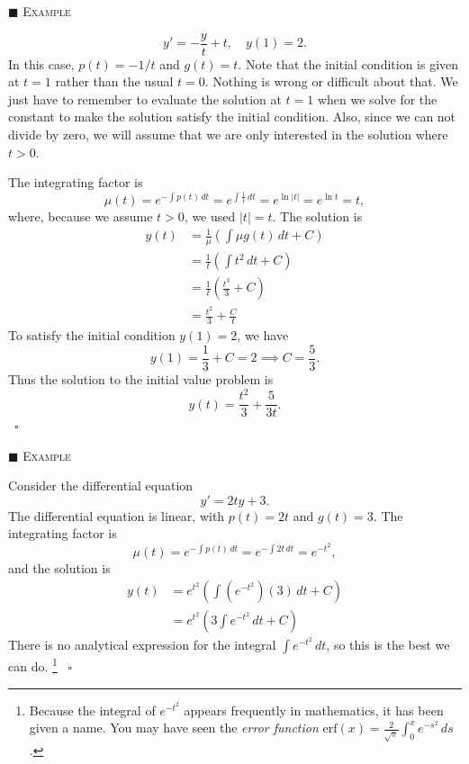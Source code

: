 \documentclass[reqno]{immbook}
\numberwithin{equation}{chapter}
\numberwithin{question}{section}
\numberwithin{theorem}{chapter}
\numberwithin{figure}{chapter}
\theoremstyle{definition}
\newenvironment{xexample}%
{%

\medskip\noindent\addtocounter{example}{1}$\blacksquare$ \textsc{Example \theexample}\hspace*{1em}%
}%
{%
~\hfill$\square$

\medskip
}
\begin{document}
\begin{xexample}
\begin{equation}
   y' = -\frac{y}{t} + t, \quad y(1) = 2.
\end{equation}
In this case, $p(t) = -1/t$ and $g(t) = t$.
Note that the initial condition is given at
$t=1$ rather than the usual $t=0$.  Nothing
is wrong or difficult about that. We just have
to remember to evaluate the solution at $t=1$
when we solve for the constant to make
the solution satisfy the initial condition.
Also, since we can not divide by zero, we will
assume that we are only interested in the solution
where $t > 0$.

The integrating factor is
\begin{equation}
   \mu(t) = e^{-\int p(t)\,dt} = e^{\int \frac{1}{t}\, dt}
      = e^{\ln |t|} = e^{\ln t} = t,
\end{equation}
where, because we assume $t>0$,  we used $|t|=t$.
The solution is
\begin{equation}
\begin{split}
   y(t) & = \frac{1}{\mu} \left( \int \mu g(t)\,dt + C\right) \\
        & = \frac{1}{t} \left( \int t^2 \,dt+C\right) \\
	& = \frac{1}{t} \left( \frac{t^3}{3} + C \right)\\
	& = \frac{t^2}{3} + \frac{C}{t}
\end{split}
\end{equation}
To satisfy the initial condition $y(1)=2$, we have
\begin{equation}
   y(1) = \frac{1}{3} + C = 2 \implies C = \frac{5}{3}.
\end{equation}
Thus the solution to the initial value problem is
\begin{equation}
   y(t) = \frac{t^2}{3} + \frac{5}{3t}.
\end{equation}
\end{xexample}

\begin{xexample}
Consider the differential equation
\begin{equation}
    y' = 2ty + 3.
\end{equation}
The differential equation is linear, with $p(t) = 2t$ and $g(t)=3$.
The integrating factor is
\begin{equation}
   \mu(t) = e^{-\int p(t)\,dt} = e^{-\int 2t\, dt}
      = e^{-t^2},
\end{equation}
and the solution is
\begin{equation}
\begin{split}
   y(t) & = e^{t^2} \left( \int \left(e^{-t^2}\right)\left(3\right)\,dt + C\right) \\
        & = e^{t^2} \left( 3\int e^{-t^2}\,dt+C\right)
\end{split}
\end{equation}
There is no analytical expression for the integral $\int e^{-t^2}\, dt$,
so this is the best we can do.%
\footnote{%
Because the integral of $e^{-t^2}$ appears frequently in mathematics,
it has been given a name.
You may have seen the \emph{error function}
$\textrm{erf}(x) = \frac{2}{\sqrt{\pi}}\int_0^x e^{-s^2}\,ds$.}
\end{xexample}
\end{document}

